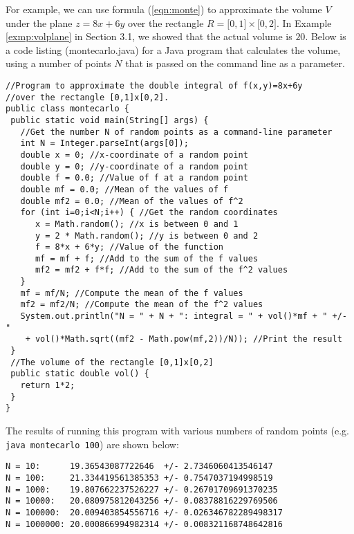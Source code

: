 For example, we can use formula (\ref{eqn:monte}) to approximate the volume $V$ under the plane $z=8x+6y$ over the
rectangle $R = \lbrack 0,1 \rbrack \times \lbrack 0,2 \rbrack$. In Example \ref{exmp:volplane} in Section 3.1, we showed
that the actual volume is $20$. Below is a code listing (montecarlo.java) for a Java program that calculates the volume,
using a number of points $N$ that is passed on the command line as a parameter.

\medskip
{}
\begin{lstlisting}
//Program to approximate the double integral of f(x,y)=8x+6y
//over the rectangle [0,1]x[0,2].
public class montecarlo {
 public static void main(String[] args) {
   //Get the number N of random points as a command-line parameter
   int N = Integer.parseInt(args[0]);
   double x = 0; //x-coordinate of a random point
   double y = 0; //y-coordinate of a random point
   double f = 0.0; //Value of f at a random point
   double mf = 0.0; //Mean of the values of f
   double mf2 = 0.0; //Mean of the values of f^2
   for (int i=0;i<N;i++) { //Get the random coordinates
      x = Math.random(); //x is between 0 and 1
      y = 2 * Math.random(); //y is between 0 and 2
      f = 8*x + 6*y; //Value of the function
      mf = mf + f; //Add to the sum of the f values
      mf2 = mf2 + f*f; //Add to the sum of the f^2 values
   }
   mf = mf/N; //Compute the mean of the f values
   mf2 = mf2/N; //Compute the mean of the f^2 values
   System.out.println("N = " + N + ": integral = " + vol()*mf + " +/- "
    + vol()*Math.sqrt((mf2 - Math.pow(mf,2))/N)); //Print the result
 }
 //The volume of the rectangle [0,1]x[0,2]
 public static double vol() {
   return 1*2;
 }
}
\end{lstlisting}
\medskip

The results of running this program with various numbers of random points (e.g. \texttt{java montecarlo 100}) are
shown below:

\begin{verbatim}
N = 10:      19.36543087722646  +/- 2.7346060413546147
N = 100:     21.334419561385353 +/- 0.7547037194998519
N = 1000:    19.807662237526227 +/- 0.26701709691370235
N = 10000:   20.080975812043256 +/- 0.08378816229769506
N = 100000:  20.009403854556716 +/- 0.026346782289498317
N = 1000000: 20.000866994982314 +/- 0.008321168748642816
\end{verbatim}

